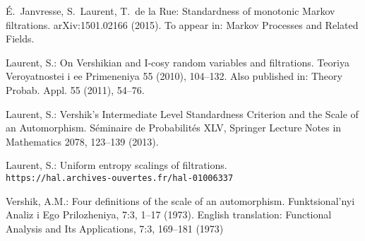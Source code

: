 \documentclass[12pt,a4paper]{article}
\begin{document}
\newpage

\begin{thebibliography}{99.}

\'E.~Janvresse, S.~Laurent, T.~de la Rue: 
Standardness of monotonic Markov filtrations. 
	arXiv:1501.02166 (2015). 
To appear in: Markov Processes and Related Fields. 


 Laurent, S.: 
On Vershikian and I-cosy random variables and filtrations.
Teoriya Veroyatnostei i ee Primeneniya 55 (2010), 104--132. 
Also published in: Theory Probab. Appl. 55 (2011), 54--76.


Laurent, S.: 
Vershik's Intermediate Level Standardness Criterion and the Scale of an Automorphism. 
S\'eminaire de Probabilit\'es XLV,
Springer Lecture Notes in Mathematics 2078,
123--139 (2013).

Laurent, S.: 
Uniform entropy scalings of filtrations. \\
\verb+https://hal.archives-ouvertes.fr/hal-01006337+ 


Vershik, A.M.: 
Four definitions of the scale of an automorphism. 
Funktsional'nyi Analiz i Ego Prilozheniya, 7:3, 
1--17 (1973). 
English translation:    
Functional Analysis and Its Applications, 7:3, 169--181 (1973)



\end{thebibliography}
\end{document}
